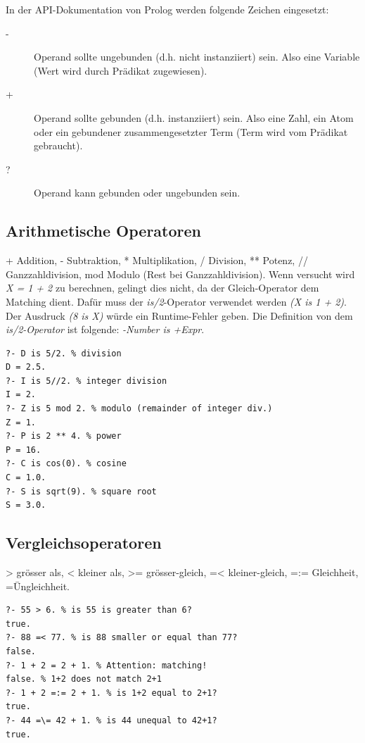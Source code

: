 \newpage
In der API-Dokumentation von Prolog werden folgende Zeichen eingesetzt:
\begin{description}
	\item[-] Operand sollte ungebunden (d.h. nicht instanziiert) sein. Also eine Variable (Wert wird durch Prädikat zugewiesen).
	\item[+] Operand sollte gebunden (d.h. instanziiert) sein. Also eine Zahl, ein Atom oder ein gebundener zusammengesetzter Term (Term wird vom Prädikat gebraucht).
	\item[?] Operand kann gebunden oder ungebunden sein.
\end{description}

\subsection{Arithmetische Operatoren}
+ Addition, - Subtraktion, * Multiplikation, / Division, ** Potenz, // Ganzzahldivision, mod Modulo (Rest bei Ganzzahldivision). Wenn versucht wird \emph{X = 1 + 2} zu berechnen, gelingt dies nicht, da der Gleich-Operator dem Matching dient. Dafür muss der \emph{is/2}-Operator verwendet werden \emph{(X is 1 + 2)}. Der Ausdruck \emph{(8 is X)} würde ein Runtime-Fehler geben. Die Definition von dem \emph{is/2-Operator} ist folgende: \emph{-Number is +Expr}.

\begin{lstlisting}[caption=Arithmetische Terme]
?- D is 5/2. % division
D = 2.5.
?- I is 5//2. % integer division
I = 2.
?- Z is 5 mod 2. % modulo (remainder of integer div.)
Z = 1.
?- P is 2 ** 4. % power
P = 16.
?- C is cos(0). % cosine
C = 1.0.
?- S is sqrt(9). % square root
S = 3.0.
\end{lstlisting}

\subsection{Vergleichsoperatoren}
> grösser als, < kleiner als, >= grösser-gleich, =< kleiner-gleich, =:= Gleichheit, =\= Ungleichheit.

\begin{lstlisting}[caption=Terme mit Vergleichen]
?- 55 > 6. % is 55 is greater than 6?
true.
?- 88 =< 77. % is 88 smaller or equal than 77?
false.
?- 1 + 2 = 2 + 1. % Attention: matching!
false. % 1+2 does not match 2+1
?- 1 + 2 =:= 2 + 1. % is 1+2 equal to 2+1?
true.
?- 44 =\= 42 + 1. % is 44 unequal to 42+1?
true.
\end{lstlisting}

